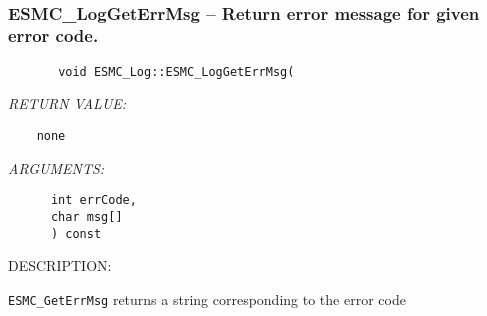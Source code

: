 \mbox{}\hrulefill\ 
 
\subsubsection [ESMC\_LogGetErrMsg] {ESMC\_LogGetErrMsg -- Return error message for given error code.}


  
\begin{verbatim}       void ESMC_Log::ESMC_LogGetErrMsg(\end{verbatim}{\em RETURN VALUE:}
\begin{verbatim}    none\end{verbatim}{\em ARGUMENTS:}
\begin{verbatim}      int errCode,
      char msg[]
      ) const\end{verbatim}
{\sf DESCRIPTION:\\ }


   {\tt ESMC\_GetErrMsg} returns a string corresponding to the error code
  

